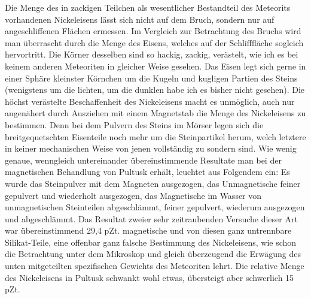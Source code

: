 \documentclass[a4paper, 11pt, oneside, german]{article}
\begin{document}
Die Menge des in zackigen Teilchen als wesentlicher Bestandteil des Meteorits vorhandenen Nickeleisens lässt sich nicht auf dem Bruch, sondern nur auf angeschliffenen Flächen ermessen. Im Vergleich zur Betrachtung des Bruchs wird man überrascht durch die Menge des Eisens, welches auf der Schlifffläche sogleich hervortritt. Die Körner desselben sind so hackig, zackig, verästelt, wie ich es bei keinem anderen Meteoriten in gleicher Weise gesehen. Das Eisen legt sich gerne in einer Sphäre kleinster Körnchen um die Kugeln und kugligen Partien des Steins (wenigstens um die lichten, um die dunklen habe ich es bisher nicht gesehen). Die höchst verästelte Beschaffenheit des Nickeleisens macht es unmöglich, auch nur angenähert durch Ausziehen mit einem Magnetstab die Menge des Nickeleisens zu bestimmen. Denn bei dem Pulvern des Steins im Mörser legen sich die breitgequetschten Eisenteile noch mehr um die Steinpartikel herum, welch letztere in keiner mechanischen Weise von jenen vollständig zu sondern sind. Wie wenig genaue, wenngleich untereinander übereinstimmende Resultate man bei der magnetischen Behandlung von Pultusk erhält, leuchtet aus Folgendem ein: Es wurde das Steinpulver mit dem Magneten ausgezogen, das Unmagnetische feiner gepulvert und wiederholt ausgezogen, das Magnetische im Wasser von unmagnetischen Steinteilen abgeschlämmt, feiner gepulvert, wiederum ausgezogen und abgeschlämmt. Das Resultat zweier sehr zeitraubenden Versuche dieser Art war übereinstimmend 29,4 pZt. magnetische und von diesen ganz untrennbare Silikat-Teile, eine offenbar ganz falsche Bestimmung des Nickeleisens, wie schon die Betrachtung unter dem Mikroskop und gleich überzeugend die Erwägung des unten mitgeteilten spezifischen Gewichts des Meteoriten lehrt. Die relative Menge des Nickeleisens in Pultusk schwankt wohl etwas, übersteigt aber schwerlich 15 pZt.
\end{document}
